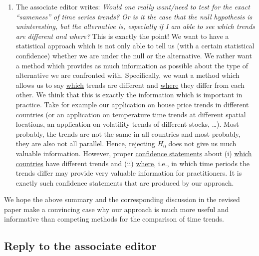 \documentclass[a4paper,12pt]{article}
\begin{document}
\begin{enumerate}[label=\arabic*.,leftmargin=0.6cm]
\begin{enumerate}[leftmargin=0.7cm]
\item The associate editor writes: \textit{Would one really want/need to test for the exact ``sameness'' of time series trends? Or is it the case that the null hypothesis is uninteresting, but the alternative is, especially if I am able to see which trends are different and where?} This is exactly the point! We want to have a statistical approach which is not only able to tell us (with a certain statistical confidence) whether we are under the null or the alternative. We rather want a method which provides as much information as possible about the type of alternative we are confronted with. Specifically, we want a method which allows us to say \underline{which} trends are different and \underline{where} they differ from each other. We think that this is exactly the information which is important in practice. Take for example our application on house price trends in different countries (or an application on temperature time trends at different spatial locations, an application on volatility trends of different stocks, \ldots).  Most probably, the trends are not the same in all countries and most probably, they are also not all parallel. Hence, rejecting $H_0$ does not give us much valuable information. However, proper \underline{confidence statements} about (i) \underline{which countries} have different trends and (ii) \underline{where}, i.e., in which time periods the trends differ may provide very valuable information for practitioners. It is exactly such confidence statements that are produced by our approach. 
\end{enumerate}  
We hope the above summary and the corresponding discussion in the revised paper make a convincing case why our approach is much more useful and informative than competing methods for the comparison of time trends. 

\end{enumerate}



\subsection*{Reply to the associate editor}
\end{document}
